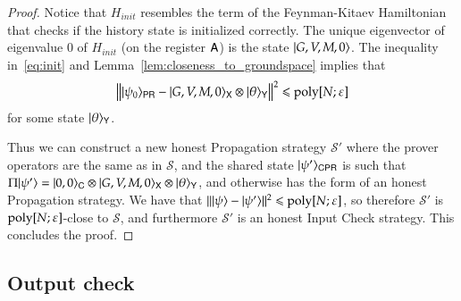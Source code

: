 \begin{proof}
	Notice that $H_{init}$ resembles the term of the Feynman-Kitaev Hamiltonian that checks if the history state is initialized correctly. The unique eigenvector of eigenvalue $0$ of $H_{init}$ (on the register ${\mathsf{A}}$) is the state $|G,V,M,0\rangle$. The inequality in~\eqref{eq:init} and Lemma~\ref{lem:closeness_to_groundspace} implies that
	\[
		\left\lVert |\psi_0\rangle_{{\mathsf{P}} {\mathsf{R}}} - |G,V,M,0\rangle_{{\mathsf{X}}} \otimes |\theta\rangle_{{\mathsf{Y}}} \right\rVert^2 \leqslant \operatorname{poly}[N;\varepsilon]
	\]
	for some state $|\theta\rangle_{{\mathsf{Y}}}$.
	
	Thus we can construct a new honest Propagation strategy $\mathcal{S}'$ where the prover operators are the same as in $\mathcal{S}$, and the shared state $|\psi'\rangle_{{\mathsf{C}} {\mathsf{P}} {\mathsf{R}}}$ is such that $\Pi |\psi'\rangle = |0,0\rangle_{{\mathsf{C}}} \otimes |G,V,M,0\rangle_{{\mathsf{X}}} \otimes |\theta\rangle_{{\mathsf{Y}}}$, and otherwise has the form of an honest Propagation strategy. We have that $\| |\psi\rangle - |\psi'\rangle \|^2 \leqslant \operatorname{poly}[N;\varepsilon]$, so therefore $\mathcal{S}'$ is $\operatorname{poly}[N;\varepsilon]$-close to $\mathcal{S}$, and furthermore $\mathcal{S}'$ is an honest Input Check strategy. This concludes the proof.
	

	

\end{proof}

\subsection{Output check}
\label{sec:output_check}


